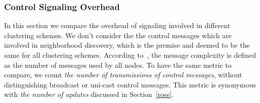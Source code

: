 \documentclass[10pt,journal,compsoc]{IEEEtran}
\theoremstyle{mytheoremstyle}
\theoremstyle{mytheoremstyle}
\theoremstyle{mytheoremstyle}
\begin{document}


%
%



\subsubsection{Control Signaling Overhead}

In this section we compare the overhead of signaling involved in different clustering schemes.
We don't consider the the control messages which are involved in neighborhood discovery, which is the premise and deemed to be the same for all clustering schemes.
According to~\cite{complexity_aggregation_2011}, the message complexity is defined as the number of messages used by all nodes.
To have the same metric to compare, we count \textit{the number of transmissions of control messages}, without distinguishing broadcast or uni-cast control messages.
This metric is synonymous with \textit{the number of updates} discussed in Section~\ref{ross}.
\end{document}
